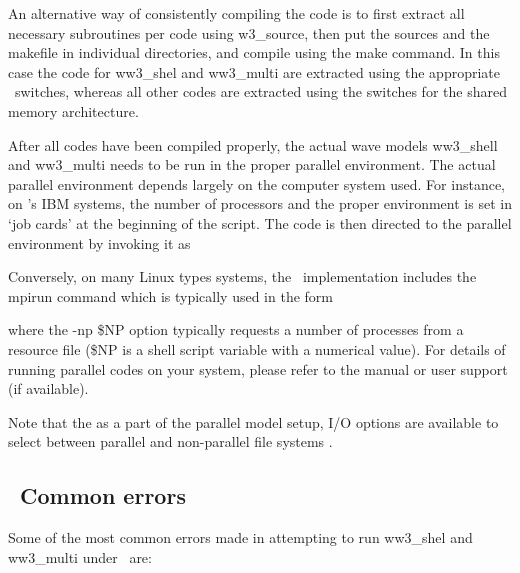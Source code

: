 An alternative way of consistently compiling the code is to first extract all
necessary subroutines per code using {\file w3\_source}, then put the sources
and the makefile in individual directories, and compile using the {\file make}
command. In this case the code for {\file ww3\_shel} and {\file ww3\_multi}
are extracted using the appropriate \mpi\ switches, whereas all other codes
are extracted using the switches for the shared memory architecture.

After all codes have been compiled properly, the actual wave models {\file
ww3\_shell} and {\code ww3\_multi} needs to be run in the proper parallel
environment. The actual parallel environment depends largely on the computer
system used. For instance, on {\ncep}'s IBM systems, the number of processors
and the proper environment is set in `job cards' at the beginning of the
script. The code is then directed to the parallel environment by invoking it
as


\noindent
Conversely, on many Linux types systems, the \mpi\ implementation includes the
{\file mpirun} command which is typically used in the form


\noindent
where the {\code -np \$NP} option typically requests a number of processes
from a resource file ({\code \$NP} is a shell script variable with a numerical
value). For details of running parallel codes on your system, please refer to
the manual or user support (if available).

Note that the as a part of the parallel model setup, I/O options are available
to select between parallel and non-parallel file systems \citep[see
also][]{tol:MMAB03a}.


\vssub
\subsection{~Common errors}
\vssub

Some of the most common errors made in attempting to run {\file ww3\_shel} and
{\file ww3\_multi} under \mpi\ are:

